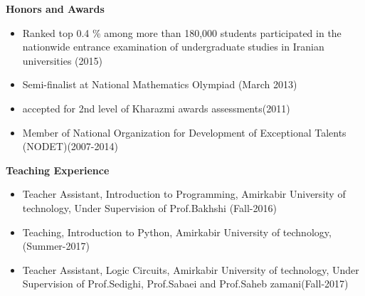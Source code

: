 \documentclass[a4paper,12pt,final]{memoir}
\newcommand{\Sep}{\vspace{1.5em}}
\newcommand{\SmallSep}{\vspace{0.5em}}
\newcommand{\CVSection}[1]
	{\Large\textbf{#1}\par
	\SmallSep\normalsize\normalfont}
\begin{document}
\CVSection{Honors and Awards}
\begin{itemize}
	\item Ranked top 0.4 \% among more than 180,000 students participated
in the nationwide entrance examination of undergraduate studies
in Iranian universities (2015) 
	\item Semi-finalist at National Mathematics Olympiad (March 2013)
	\item accepted for 2nd level of Kharazmi awards assessments(2011)
	\item Member of National Organization for Development of Exceptional  Talents (NODET)(2007-2014)
 
\end{itemize}

\Sep



\CVSection{Teaching Experience}
	\begin{itemize}
	\item  Teacher Assistant, Introduction to Programming, Amirkabir University of technology, Under Supervision of Prof.Bakhshi (Fall-2016)
	\end{itemize}
	\begin{itemize}
	\item  Teaching, Introduction to Python, Amirkabir University of technology, (Summer-2017)
	\end{itemize}
	\begin{itemize}
	\item   Teacher Assistant, Logic Circuits, Amirkabir University of technology, Under Supervision of Prof.Sedighi, Prof.Sabaei and Prof.Saheb zamani(Fall-2017)
	\end{itemize}
\Sep

\newpage
\normalsize\normalfont
\framebreak
\framebreak
\\
\end{document}
